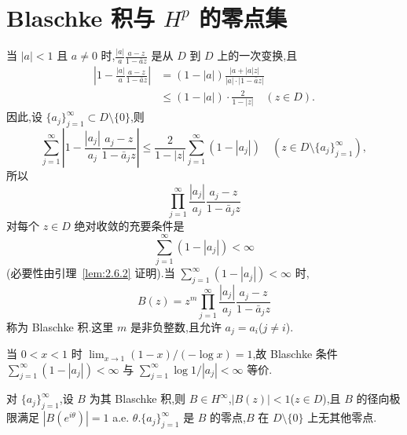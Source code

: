 \section{\texorpdfstring{Blaschke 积与 $H^p$ 的零点集}{Blaschke 积与 Hp 的零点集}}\label{sec:2.6}


当 $|a| < 1$ 且 $a \neq 0$ 时,$\frac{|a|}{a}\frac{a - z}{1 - \bar{a}z}$ 是从 $D$ 到 $D$ 上的一次变换,且
\begin{align*}
\left|1 - \frac{|a|}{a}\frac{a - z}{1 - \bar{a}z}\right| & = (1 - |a|)\frac{|a + |a|z|}{|a|\cdot|1 - \bar{a}z|} \\
& \leq (1 - |a|)\cdot\frac{2}{1 - |z|} \quad (z \in D).
\end{align*}
因此,设 $\{a_{j}\}_{j=1}^{\infty} \subset D \setminus \{0\}$,则
\begin{equation*}
\sum_{j = 1}^{\infty}\left|1 - \frac{|a_{j}|}{a_{j}}\frac{a_{j} - z}{1 - \bar{a}_{j}z}\right| \leq \frac{2}{1 - |z|}\sum_{j = 1}^{\infty}(1 - |a_{j}|) \quad (z \in D \setminus \{a_{j}\}_{j=1}^{\infty}),
\end{equation*}
所以
\begin{equation*}
\prod_{j = 1}^{\infty}\frac{|a_{j}|}{a_{j}}\frac{a_{j} - z}{1 - \bar{a}_{j}z}
\end{equation*}
对每个 $z \in D$ 绝对收敛的充要条件是
\begin{equation*}
\sum_{j = 1}^{\infty}(1 - |a_{j}|) < \infty
\end{equation*}
(必要性由引理~\ref{lem:2.6.2} 证明).当 $\sum_{j=1}^{\infty}(1 - |a_{j}|) < \infty$ 时,
\begin{equation*}
B(z) = z^{m}\prod_{j = 1}^{\infty}\frac{|a_{j}|}{a_{j}}\frac{a_{j} - z}{1 - \bar{a}_{j}z}
\end{equation*}
称为 Blaschke 积.这里 $m$ 是非负整数,且允许 $a_{j} = a_{i}$($j \neq i$).

当 $0 < x < 1$ 时 $\lim_{x \to 1}(1 - x)/(-\log x) = 1$,故 Blaschke 条件 $\sum_{j=1}^{\infty}(1 - |a_{j}|) < \infty$ 与 $\sum_{j=1}^{\infty}\log 1/|a_{j}| < \infty$ 等价.

\begin{theorem}\label{thm:2.6.1}
对 $\{a_{j}\}_{j=1}^{\infty}$,设 $B$ 为其 Blaschke 积,则 $B \in H^{\infty}$,$|B(z)| < 1$($z \in D$),且 $B$ 的径向极限满足 $|B(e^{i\theta})| = 1$ a.e. $\theta$.$\{a_{j}\}_{j=1}^{\infty}$ 是 $B$ 的零点,$B$ 在 $D \setminus \{0\}$ 上无其他零点.
\end{theorem}

